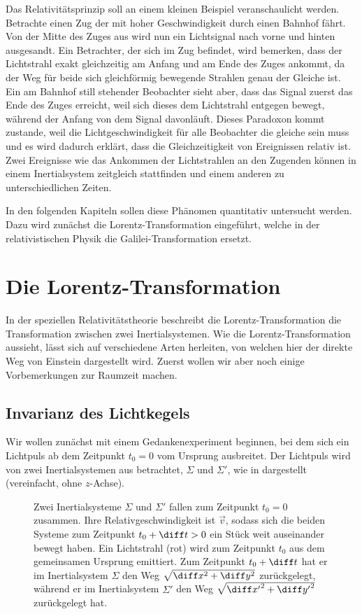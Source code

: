 Das Relativitätsprinzip soll an einem kleinen Beispiel veranschaulicht werden. Betrachte einen Zug der mit hoher Geschwindigkeit durch einen Bahnhof fährt.
Von der Mitte des Zuges aus wird nun ein Lichtsignal nach vorne und hinten ausgesandt. Ein Betrachter, der sich im Zug befindet, wird bemerken, dass der Lichtstrahl exakt gleichzeitig am Anfang und am Ende des Zuges ankommt, da der Weg für beide sich gleichförmig bewegende Strahlen genau der Gleiche ist.
Ein am Bahnhof still stehender Beobachter sieht aber, dass das Signal zuerst das Ende des Zuges erreicht, weil sich dieses dem Lichtstrahl entgegen bewegt, während der Anfang von dem Signal davonläuft.
Dieses Paradoxon kommt zustande, weil die Lichtgeschwindigkeit für alle Beobachter die gleiche sein muss und es wird dadurch erklärt, dass die Gleichzeitigkeit von Ereignissen relativ ist.
Zwei Ereignisse wie das Ankommen der Lichtstrahlen an den Zugenden können in einem Inertialsystem zeitgleich stattfinden und einem anderen zu unterschiedlichen Zeiten.

In den folgenden Kapiteln sollen diese Phänomen quantitativ untersucht werden.
Dazu wird zunächst die Lorentz-Transformation eingeführt, welche in der relativistischen Physik die Galilei-Transformation ersetzt.


\section{Die Lorentz-Transformation}

In der speziellen Relativitätstheorie beschreibt die Lorentz-Transformation die Transformation zwischen zwei Inertialsystemen.
Wie die Lorentz-Transformation aussieht, lässt sich auf verschiedene Arten herleiten, von welchen hier der direkte Weg von Einstein dargestellt wird.
Zuerst wollen wir aber noch einige Vorbemerkungen zur Raumzeit machen.


\subsection{Invarianz des Lichtkegels}

Wir wollen zunächst mit einem Gedankenexperiment beginnen, bei dem sich ein Lichtpuls ab dem Zeitpunkt $t_0=0$ vom Ursprung ausbreitet.
Der Lichtpuls wird von zwei Inertialsystemen aus betrachtet, $\Sigma$ und $\Sigma'$, wie in  dargestellt (vereinfacht, ohne $z$-Achse).

\begin{figure}[htb]
    \centering
    \tfigSRTGedankenExperimentLichtkegel
    \caption{Zwei Inertialsysteme $\Sigma$ und $\Sigma'$ fallen zum Zeitpunkt $t_0=0$ zusammen. Ihre Relativgeschwindigkeit ist $\vec v$, sodass sich die beiden Systeme zum Zeitpunkt $t_0+\diff t>0$ ein Stück weit auseinander bewegt haben.
    Ein Lichtstrahl (rot) wird zum Zeitpunkt $t_0$ aus dem gemeinsamen Ursprung emittiert.
    Zum Zeitpunkt $t_0+\diff t$ hat er im Inertialsystem $\Sigma$ den Weg $\sqrt{\diff x^2+\diff y^2}$ zurückgelegt, während er im Inertialsystem $\Sigma'$ den Weg $\sqrt{{\diff x'}^2+{\diff y'}^2}$ zurückgelegt hat. }
    \label{fig:srt_gedankenexperiment_lichtkegel}
\end{figure}

